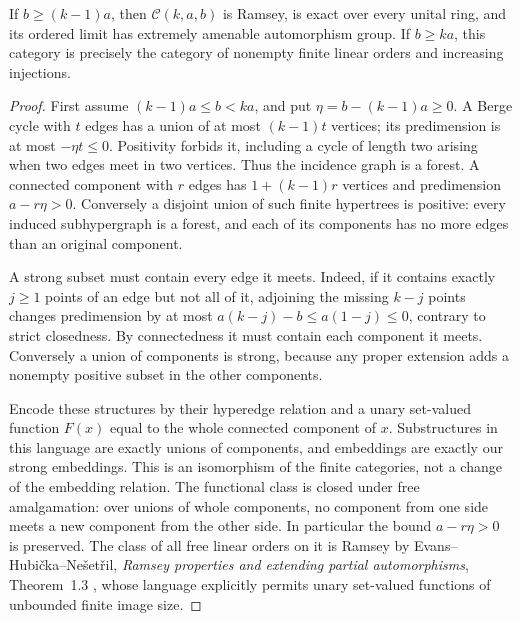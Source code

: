 \begin{theorem}
\label{D:high}
If $b\geq(k-1)a$, then $\mathcal C(k,a,b)$ is Ramsey, is exact
over every unital ring, and its ordered limit has extremely amenable
automorphism group. If $b\geq ka$, this category is precisely the
category of nonempty finite linear orders and increasing injections.
\end{theorem}
\begin{proof}
First assume $(k-1)a\leq b<ka$, and put
$\eta=b-(k-1)a\geq0$. A Berge cycle with $t$ edges has a union
of at most $(k-1)t$ vertices; its predimension is at most
$-\eta t\leq0$. Positivity forbids it, including a cycle of length
two arising when two edges meet in two vertices. Thus the incidence
graph is a forest. A connected component with $r$ edges has
$1+(k-1)r$ vertices and predimension $a-r\eta>0$.
Conversely a disjoint union of such finite hypertrees is positive:
every induced subhypergraph is a forest, and each of its components
has no more edges than an original component.

A strong subset must contain every edge it meets. Indeed, if it
contains exactly $j\geq1$ points of an edge but not all of it, adjoining
the missing $k-j$ points changes predimension by at most
$a(k-j)-b\leq a(1-j)\leq0$, contrary to strict closedness.
By connectedness it must contain each component it meets. Conversely
a union of components is strong, because any proper extension adds
a nonempty positive subset in the other components.

Encode these structures by their hyperedge relation and a unary
set-valued function $F(x)$ equal to the whole connected component
of $x$. Substructures in this language are exactly unions of
components, and embeddings are exactly our strong embeddings. This
is an isomorphism of the finite categories, not a change of the
embedding relation. The functional class is closed under free
amalgamation: over unions of whole components, no component from
one side meets a new component from the other side. In particular
the bound $a-r\eta>0$ is preserved. The class of all free linear
orders on it is Ramsey by Evans--Hubi\v cka--Ne\v set\v ril,
\emph{Ramsey properties and extending partial automorphisms},
Theorem~1.3 \cite{D-EHN2021}, whose language explicitly permits
unary set-valued functions of unbounded finite image size.


\end{proof}

